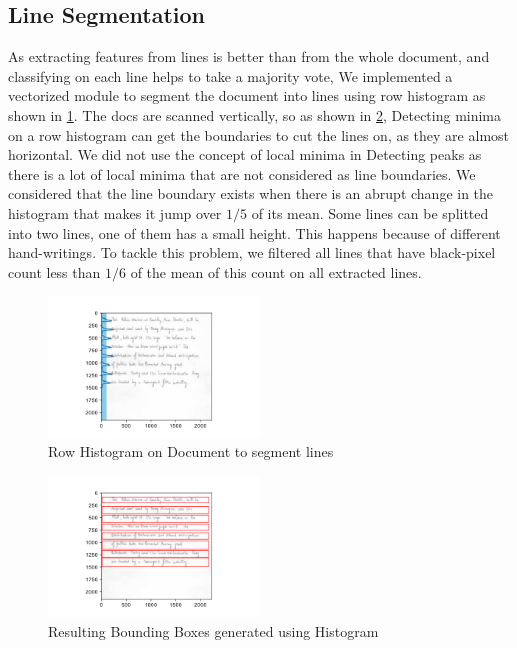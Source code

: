 \subsection{Line Segmentation}
As extracting features from lines is better than from the whole document, and classifying on each line helps to take a majority vote, We implemented a vectorized module to segment the document into lines using row histogram as shown in \ref{fig:histogram}. The docs are scanned vertically, so as shown in \ref{fig:bounding-boxes}, Detecting minima on a row histogram can get the boundaries to cut the lines on, as they are almost horizontal. We did not use the concept of local minima in Detecting peaks as there is a lot of local minima that are not considered as line boundaries. We considered that the line boundary exists when there is an abrupt change in the histogram that makes it jump over $1/5$ of its mean. Some lines can be splitted into two lines, one of them has a small height. This happens because of different hand-writings. To tackle this problem, we filtered all lines that have black-pixel count less than $1/6$ of the mean of this count on all extracted lines. 

\begin{figure}
    \centering
    \includegraphics[width=0.5\textwidth]{images/histo.png}
    \caption{Row Histogram on Document to segment lines}
    \label{fig:histogram}
\end{figure}

\begin{figure}
    \centering
    \includegraphics[width=0.5\textwidth]{images/BB.png}
    \caption{Resulting Bounding Boxes generated using Histogram}
    \label{fig:bounding-boxes}
\end{figure}

